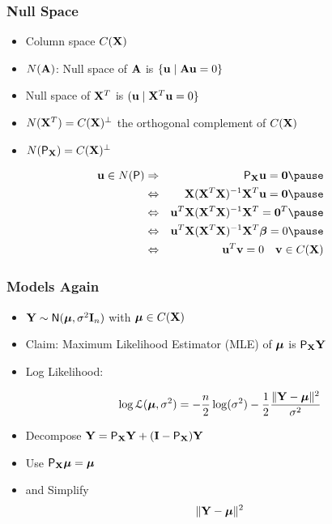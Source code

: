 \documentclass{beamer}
\begin{document}
\begin{frame} \frametitle{Null Space}
  \begin{itemize}
  \item   Column space $C(\mathbf{X})$   \pause
  \item  $N(\mathbf{A})$: Null space of $\mathbf{A}$ is  $\{ \mathbf{u} \mid \mathbf{A} \mathbf{u} = 0 \}$   \pause
  \item  Null space of $\mathbf{X}^T$ is $(\mathbf{u} \mid \mathbf{X}^T \mathbf{u} = 0 \}$  \pause
  \item  $ N(\mathbf{X}^T) = C(\mathbf{X})^\perp$ the orthogonal complement of $C(\mathbf{X})$  \pause 
  \item $N(\textsf{P}_{\mathbf{X}}) = C(\mathbf{X})^\perp$   \pause
  \end{itemize}
  \begin{eqnarray*}
\u \in N(\P) & \Rightarrow & \P_\X \u = \zero   \pause\\
& \Leftrightarrow &    \X(\X^T\X)^{-1} \X^T \u = \zero  \pause  \\
& \Leftrightarrow & \u^T\X(\X^T\X)^{-1} \X^T   = \zero^T   \pause \\
& \Leftrightarrow & \u^T\X(\X^T\X)^{-1} \X^T\b   = 0   \pause \\
& \Leftrightarrow & \u^T\v   = 0  \quad
   \v \in C(\X)\\ 
  \end{eqnarray*}
\end{frame}
\begin{frame} \frametitle{Models Again}
  \begin{itemize}
  \item   $\mathbf{Y} \sim \textsf{N}(\boldsymbol{\mu}, \sigma^2 \mathbf{I}_n)$ with $\boldsymbol{\mu} \in C(\mathbf{X})$  \pause
  \item   Claim: Maximum Likelihood Estimator (MLE) of $\boldsymbol{\mu}$ is
    $\textsf{P}_{\mathbf{X}} \mathbf{Y}$  \pause
\item Log Likelihood:  \pause

$$ \log {\cal{L}}(\boldsymbol{\mu}, \sigma^2) =
-\frac{n}{2} \log(\sigma^2) 
  - \frac 1 2 \frac{\| \mathbf{Y} - \boldsymbol{\mu} \|^2}{\sigma^2} 
$$  \pause
\item Decompose $\mathbf{Y} = \textsf{P}_{\mathbf{X}} \mathbf{Y} + (\mathbf{I} - \textsf{P}_{\mathbf{X}}) \mathbf{Y}$  \pause
\item Use $\textsf{P}_{\mathbf{X}} \boldsymbol{\mu} = \boldsymbol{\mu}$  \pause
\item and Simplify $$\| \mathbf{Y} - \boldsymbol{\mu} \|^2$$
  \end{itemize}

\end{frame}
\end{document}
